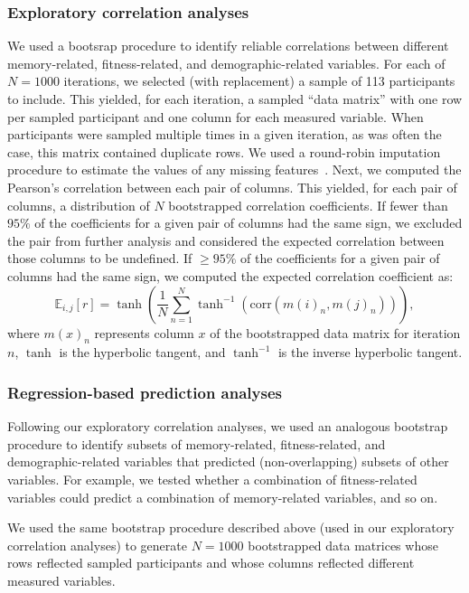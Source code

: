 \documentclass[10pt]{article}
\begin{document}
\subsubsection*{Exploratory correlation analyses}
We used a bootsrap procedure to identify reliable correlations between
different memory-related, fitness-related, and demographic-related
variables.  For each of $N = 1000$ iterations, we selected (with
replacement) a sample of 113 participants to include.  This yielded,
for each iteration, a sampled ``data matrix'' with one row per sampled
participant and one column for each measured variable.  When
participants were sampled multiple times in a given iteration, as was
often the case, this matrix contained duplicate rows.  We used a
round-robin imputation procedure to estimate the values of any missing
features~\citep{Buck60}.  Next, we computed the Pearson's correlation
between each pair of columns.  This yielded, for each pair of columns,
a distribution of $N$ bootstrapped correlation coefficients.  If fewer
than $95\%$ of the coefficients for a given pair of columns had the
same sign, we excluded the pair from further analysis and considered
the expected correlation between those columns to be undefined.  If
$\geq 95\%$ of the coefficients for a given pair of columns had the
same sign, we computed the expected correlation coefficient as:
\[
  \mathbb{E}_{i, j}\left[ r\right] = \tanh\left(\frac{1}{N} \sum_{n=1}^N
  \tanh^{-1}(\mathrm{corr}\left(m(i)_n, m(j)_n\right))\right),
\]
where $m(x)_n$ represents column $x$ of the bootstrapped data matrix
for iteration $n$, $\tanh$ is the hyperbolic tangent, and $\tanh^{-1}$
is the inverse hyperbolic tangent.

\subsubsection*{Regression-based prediction analyses}
Following our exploratory correlation analyses, we used an analogous
bootstrap procedure to identify subsets of memory-related,
fitness-related, and demographic-related variables that predicted
(non-overlapping) subsets of other variables.  For example, we tested
whether a combination of fitness-related variables could predict a
combination of memory-related variables, and so on.

We used the same bootstrap procedure described above (used in our
exploratory correlation analyses) to generate $N = 1000$ bootstrapped
data matrices whose rows reflected sampled participants and whose
columns reflected different measured variables.
\end{document}
